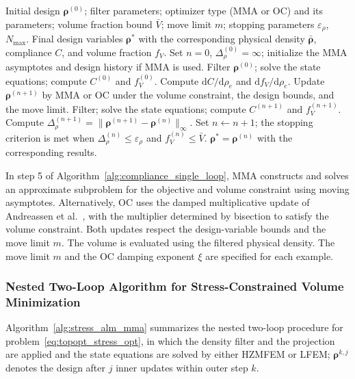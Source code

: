 \begin{algorithm}[H]
\caption{Single-loop optimization procedure based on MMA or OC}
\label{alg:compliance_single_loop}
\begin{algorithmic}[1]
\Require Initial design $\boldsymbol{\rho}^{(0)}$; filter parameters; optimizer type (MMA or OC) and its parameters; volume fraction bound $\bar{V}$; move limit $m$; stopping parameters $\varepsilon_\rho$, $N_{\max}$.
\Ensure Final design variables $\boldsymbol{\rho}^*$ with the corresponding physical density $\bar{\boldsymbol{\rho}}$, compliance $C$, and volume fraction $f_V$.
\State Set $n = 0$, $\Delta_\rho^{(0)} = \infty$; initialize the MMA asymptotes and design history if MMA is used.
\State Filter $\boldsymbol{\rho}^{(0)}$; solve the state equations; compute $C^{(0)}$ and $f_V^{(0)}$.
\State Compute $\mathrm{d}C/\mathrm{d}\rho_e$ and $\mathrm{d}f_V/\mathrm{d}\rho_e$.
\State Update $\boldsymbol{\rho}^{(n+1)}$ by MMA or OC under the volume constraint, the design bounds, and the move limit.
\State Filter; solve the state equations; compute $C^{(n+1)}$ and $f_V^{(n+1)}$.
\State Compute $\Delta_\rho^{(n+1)} = \|\boldsymbol{\rho}^{(n+1)} - \boldsymbol{\rho}^{(n)}\|_\infty$.
\State Set $n \leftarrow n + 1$; the stopping criterion is met when $\Delta_\rho^{(n)} \le \varepsilon_\rho$ and $f_V^{(n)} \le \bar{V}$.
\EndWhile
\State \Return $\boldsymbol{\rho}^* = \boldsymbol{\rho}^{(n)}$ with the corresponding results.
\end{algorithmic}
\end{algorithm}

In step 5 of Algorithm~\ref{alg:compliance_single_loop}, MMA constructs and solves an approximate subproblem for the objective and volume constraint using moving asymptotes. Alternatively, OC uses the damped multiplicative update of Andreassen et al.~\cite{Andreassen2011}, with the multiplier determined by bisection to satisfy the volume constraint. Both updates respect the design-variable bounds and the move limit $m$. The volume is evaluated using the filtered physical density. The move limit $m$ and the OC damping exponent $\xi$ are specified for each example.

\subsubsection{Nested Two-Loop Algorithm for Stress-Constrained Volume Minimization}

Algorithm~\ref{alg:stress_alm_mma} summarizes the nested two-loop procedure for problem~\eqref{eq:topopt_stress_opt}, in which the density filter and the projection are applied and the state equations are solved by either HZMFEM or LFEM; $\boldsymbol{\rho}^{k,j}$ denotes the design after $j$ inner updates within outer step $k$.


